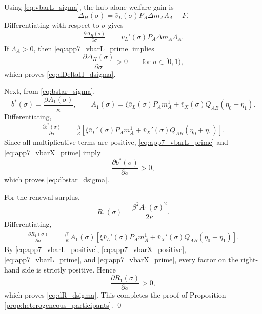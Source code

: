 Using \eqref{eq:vbarL_sigma}, the hub-alone welfare gain is
\[
\Delta_H(\sigma)=\bar v_L(\sigma)P_A\Delta m_A\Lambda_A-F.
\]
Differentiating with respect to $\sigma$ gives
\begin{align}
\frac{\partial \Delta_H(\sigma)}{\partial \sigma}
&=
\bar v_L'(\sigma)P_A\Delta m_A\Lambda_A.
\label{eq:app7_dDeltaH_dsigma_raw}
\end{align}
If $\Lambda_A>0$, then \eqref{eq:app7_vbarL_prime} implies
\[
\frac{\partial \Delta_H(\sigma)}{\partial \sigma}>0
\qquad
\text{for }\sigma\in[0,1),
\]
which proves \eqref{eq:dDeltaH_dsigma}.

Next, from \eqref{eq:bstar_sigma},
\[
b^*(\sigma)=\frac{\beta A_1(\sigma)}{\kappa},
\qquad
A_1(\sigma)=\xi \bar v_L(\sigma)P_A m_A^1+\bar v_X(\sigma)Q_{AB}(\eta_0+\eta_1).
\]
Differentiating,
\begin{align}
\frac{\partial b^*(\sigma)}{\partial \sigma}
&=
\frac{\beta}{\kappa}
\left[
\xi \bar v_L'(\sigma)P_A m_A^1
+
\bar v_X'(\sigma)Q_{AB}(\eta_0+\eta_1)
\right].
\label{eq:app7_dbstar_dsigma_raw}
\end{align}
Since all multiplicative terms are positive, \eqref{eq:app7_vbarL_prime} and \eqref{eq:app7_vbarX_prime} imply
\[
\frac{\partial b^*(\sigma)}{\partial \sigma}>0,
\]
which proves \eqref{eq:dbstar_dsigma}.

For the renewal surplus,
\[
R_1(\sigma)=\frac{\beta^2A_1(\sigma)^2}{2\kappa}.
\]
Differentiating,
\begin{align}
\frac{\partial R_1(\sigma)}{\partial \sigma}
&=
\frac{\beta^2}{\kappa}
A_1(\sigma)
\left[
\xi \bar v_L'(\sigma)P_A m_A^1
+
\bar v_X'(\sigma)Q_{AB}(\eta_0+\eta_1)
\right].
\label{eq:app7_dR_dsigma_raw}
\end{align}
By \eqref{eq:app7_vbarL_positive}, \eqref{eq:app7_vbarX_positive}, \eqref{eq:app7_vbarL_prime}, and \eqref{eq:app7_vbarX_prime}, every factor on the right-hand side is strictly positive. Hence
\[
\frac{\partial R_1(\sigma)}{\partial \sigma}>0,
\]
which proves \eqref{eq:dR_dsigma}. This completes the proof of Proposition \ref{prop:heterogeneous_participants}.
\qed
